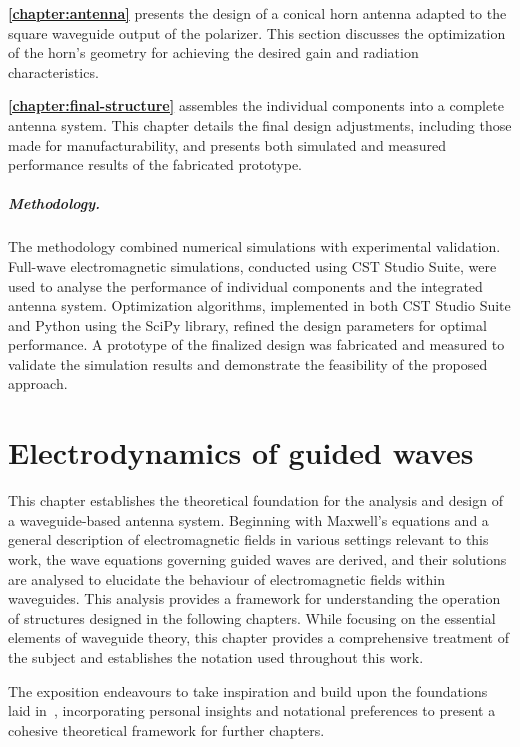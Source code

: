 \documentclass[11pt,a4paper,twoside,openany]{report}
\begin{document}
\textbf{\cref{chapter:antenna}} presents the design of a conical horn antenna adapted to the square waveguide output of the polarizer. This section discusses the optimization of the horn's geometry for achieving the desired gain and radiation characteristics.

\textbf{\cref{chapter:final-structure}} assembles the individual components into a complete antenna system. This chapter details the final design adjustments, including those made for manufacturability, and presents both simulated and measured performance results of the fabricated prototype.

\paragraph*{Methodology.} The methodology combined numerical simulations with experimental validation. Full-wave electromagnetic simulations, conducted using CST Studio Suite, were used to analyse the performance of individual components and the integrated antenna system. Optimization algorithms, implemented in both CST Studio Suite and Python using the SciPy library, refined the design parameters for optimal performance. A prototype of the finalized design was fabricated and measured to validate the simulation results and demonstrate the feasibility of the proposed approach.


\chapter{Electrodynamics of guided waves}
\label{chapter:electrodynamics}
This chapter establishes the theoretical foundation for the analysis and design of a waveguide-based antenna system. Beginning with Maxwell's equations and a general description of electromagnetic fields in various settings relevant to this work, the wave equations governing guided waves are derived, and their solutions are analysed to elucidate the behaviour of electromagnetic fields within waveguides. This analysis provides a framework for understanding the operation of structures designed in the following chapters. While focusing on the essential elements of waveguide theory, this chapter provides a comprehensive treatment of the subject and establishes the notation used throughout this work.

The exposition endeavours to take inspiration and build upon the foundations laid in~\parencite{balanis:advanced-engineering-electromagnetics,griffiths:introduction-to-electrodynamics,zangwill:modern-electrodynamics}, incorporating personal insights and notational preferences to present a cohesive theoretical framework for further chapters.
\end{document}
